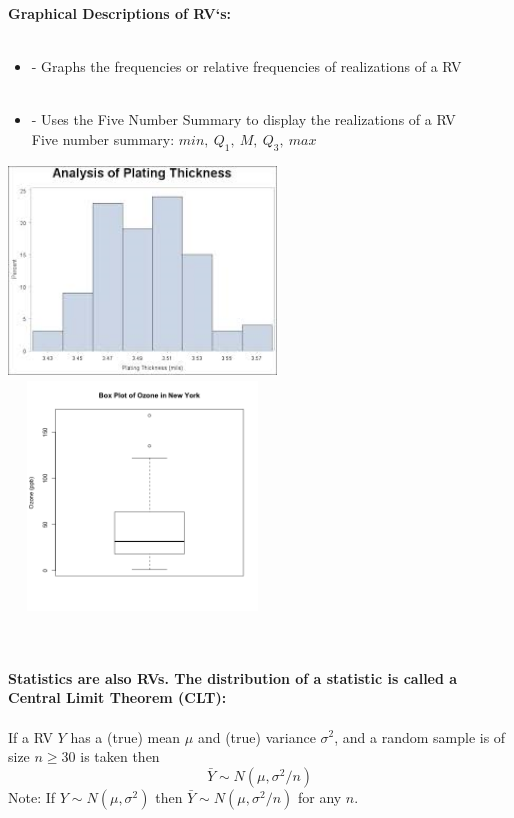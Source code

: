 \large \textbf{Graphical Descriptions of RV`s:}\normalsize\\~\\
\begin{itemize}
\item {} - Graphs the frequencies or relative frequencies of realizations of a RV\\~\\
\item {} - Uses the Five Number Summary to display the realizations of a RV\\
Five number summary: $min,~Q_1,~M,~Q_3,~max$
\end{itemize}

\begin{center}
\includegraphics[width=2.8in, height=2.2in]{histogram}~~~~~~~~~~~\includegraphics[width=2.8in, height=2.4in]{boxplot}
\end{center}

~\\~\\
\large \textbf{Statistics are also RVs.  The distribution of a statistic is called a} \normalsize\\
\textbf{Central Limit Theorem (CLT):}\\~\\
If a RV $Y$ has a (true) mean $\mu$ and (true) variance $\sigma^2$, and a random sample is of size $n\geq 30$ is taken then
$$\bar{Y}\sim N(\mu,\sigma^2/n)$$
Note: If $Y\sim N(\mu,\sigma^2)$ then $\bar{Y}\sim N(\mu,\sigma^2/n)$ for any $n$.\\~\\

